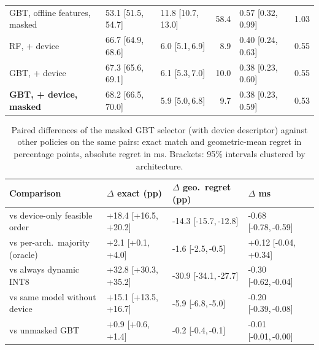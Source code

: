 \begin{table}[!htbp]
\begin{tabular}{@{}lllrlr@{}}
GBT, offline features, masked & 53.1 [51.5,\,54.7] & 11.8 [10.7,\,13.0] & 58.4 & 0.57 [0.32,\,0.99] & 1.03 \\
RF, + device & 66.7 [64.9,\,68.6] & 6.0 [5.1,\,6.9] & 8.9 & 0.40 [0.24,\,0.63] & 0.55 \\
GBT, + device & 67.3 [65.6,\,69.1] & 6.1 [5.3,\,7.0] & 10.0 & 0.38 [0.23,\,0.60] & 0.55 \\
\textbf{GBT, + device, masked} & 68.2 [66.5,\,70.0] & 5.9 [5.0,\,6.8] & 9.7 & 0.38 [0.23,\,0.59] & 0.53 \\
\bottomrule
\end{tabular}
\end{table}

\begin{table}[!htbp]
\centering
\caption{Paired differences of the masked GBT selector (with device
descriptor) against other policies on the same pairs: exact match and
geometric-mean regret in percentage points, absolute regret in ms. Brackets:
95\% intervals clustered by architecture.}
\label{tab:paired}
\footnotesize
\begin{tabular}{@{}llll@{}}
\toprule
\textbf{Comparison} & \textbf{$\Delta$ exact (pp)} & \textbf{$\Delta$ geo.\ regret (pp)} & \textbf{$\Delta$ ms}\\
\midrule
vs device-only feasible order & +18.4 [+16.5,\,+20.2] & -14.3 [-15.7,\,-12.8] & -0.68 [-0.78,\,-0.59] \\
vs per-arch.\ majority (oracle) & +2.1 [+0.1,\,+4.0] & -1.6 [-2.5,\,-0.5] & +0.12 [-0.04,\,+0.34] \\
vs always dynamic INT8 & +32.8 [+30.3,\,+35.2] & -30.9 [-34.1,\,-27.7] & -0.30 [-0.62,\,-0.04] \\
vs same model without device & +15.1 [+13.5,\,+16.7] & -5.9 [-6.8,\,-5.0] & -0.20 [-0.39,\,-0.08] \\
vs unmasked GBT & +0.9 [+0.6,\,+1.4] & -0.2 [-0.4,\,-0.1] & -0.01 [-0.01,\,-0.00] \\
\bottomrule
\end{tabular}
\end{table}

